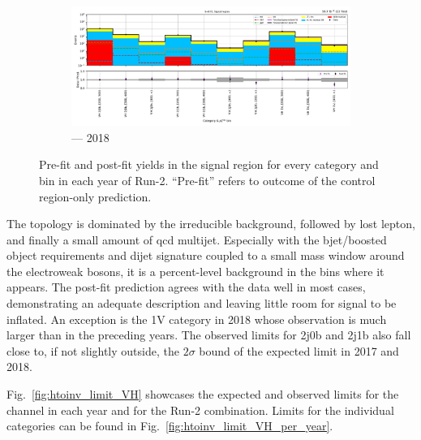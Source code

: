 \begin{figure}[htbp]
    \begin{subfigure}[b]{0.9\textwidth}
        \includegraphics[width=\textwidth]{figures/mountain_ranges/2018/VH/SR_tree_fit_s-abs_values_VH_cats.pdf}
        \caption{\VH --- 2018}
    \end{subfigure}
    \caption[Pre-fit and post-fit yields in the signal region for every \VH category and \ptmiss bin in each year of Run-2]{Pre-fit and post-fit yields in the signal region for every \VH category and \ptmiss bin in each year of Run-2. ``Pre-fit'' refers to outcome of the control region-only prediction.}
    \label{fig:htoinv_mountain_range_VH_SR_Postfit}
\end{figure}

The \VH topology is dominated by the irreducible \ztonunupjets background, followed by lost lepton, and finally a small amount of \acrshort{qcd} multijet. Especially with the \gls{bjet}/boosted object requirements and dijet signature coupled to a small mass window around the electroweak bosons, it is a percent-level background in the bins where it appears. The post-fit prediction agrees with the data well in most cases, demonstrating an adequate description and leaving little room for signal to be inflated. An exception is the 1V category in 2018 whose observation is much larger than in the preceding years. The observed limits for 2j0b and 2j1b also fall close to, if not slightly outside, the $\text{2}\sigma$ bound of the expected limit in 2017 and 2018.

Fig.~\ref{fig:htoinv_limit_VH} showcases the expected and observed limits for the \VH channel in each year and for the Run-2 combination. Limits for the individual categories can be found in Fig.~\ref{fig:htoinv_limit_VH_per_year}.

\clearpage

